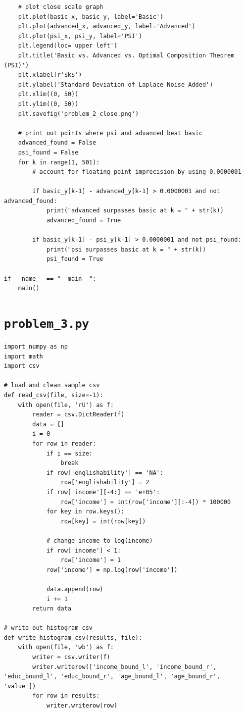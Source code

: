 \documentclass[12pt]{article}
\def\cl{\lstinline}
\begin{document}
\begin{appendices}
\begin{lstlisting}
    # plot close scale graph
    plt.plot(basic_x, basic_y, label='Basic')
    plt.plot(advanced_x, advanced_y, label='Advanced')
    plt.plot(psi_x, psi_y, label='PSI')
    plt.legend(loc='upper left')
    plt.title('Basic vs. Advanced vs. Optimal Composition Theorem (PSI)')
    plt.xlabel(r'$k$')
    plt.ylabel('Standard Deviation of Laplace Noise Added')
    plt.xlim((0, 50))
    plt.ylim((0, 50))
    plt.savefig('problem_2_close.png')

    # print out points where psi and advanced beat basic 
    advanced_found = False
    psi_found = False
    for k in range(1, 501):
        # account for floating point imprecision by using 0.0000001

        if basic_y[k-1] - advanced_y[k-1] > 0.0000001 and not advanced_found:
            print("advanced surpasses basic at k = " + str(k))
            advanced_found = True

        if basic_y[k-1] - psi_y[k-1] > 0.0000001 and not psi_found:
            print("psi surpasses basic at k = " + str(k))
            psi_found = True

if __name__ == "__main__":
    main()
\end{lstlisting}

\newpage

\section{\cl{problem_3.py}}
\label{appendix:problem_3}

\begin{lstlisting}
import numpy as np
import math
import csv

# load and clean sample csv
def read_csv(file, size=-1):
    with open(file, 'rU') as f:
        reader = csv.DictReader(f)
        data = []
        i = 0
        for row in reader:
            if i == size:
                break
            if row['englishability'] == 'NA':
                row['englishability'] = 2
            if row['income'][-4:] == 'e+05':
                row['income'] = int(row['income'][:-4]) * 100000
            for key in row.keys():
                row[key] = int(row[key])

            # change income to log(income)
            if row['income'] < 1:
                row['income'] = 1
            row['income'] = np.log(row['income'])

            data.append(row)
            i += 1
        return data

# write out histogram csv
def write_histogram_csv(results, file):
    with open(file, 'wb') as f:
        writer = csv.writer(f)
        writer.writerow(['income_bound_l', 'income_bound_r', 'educ_bound_l', 'educ_bound_r', 'age_bound_l', 'age_bound_r', 'value'])
        for row in results:
            writer.writerow(row)


\end{lstlisting}
\end{appendices}
\end{document}
